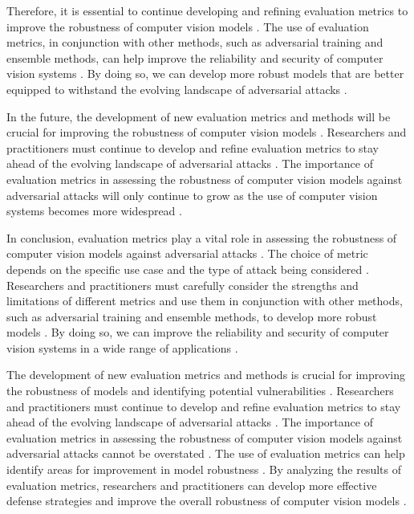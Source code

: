 \documentclass[11pt]{article}
\begin{document}
Therefore, it is essential to continue developing and refining evaluation metrics to improve the robustness of computer vision models \cite{ref165}. The use of evaluation metrics, in conjunction with other methods, such as adversarial training and ensemble methods, can help improve the reliability and security of computer vision systems \cite{ref21}. By doing so, we can develop more robust models that are better equipped to withstand the evolving landscape of adversarial attacks \cite{ref166}.

In the future, the development of new evaluation metrics and methods will be crucial for improving the robustness of computer vision models \cite{ref90}. Researchers and practitioners must continue to develop and refine evaluation metrics to stay ahead of the evolving landscape of adversarial attacks \cite{ref20}. The importance of evaluation metrics in assessing the robustness of computer vision models against adversarial attacks will only continue to grow as the use of computer vision systems becomes more widespread \cite{ref106}.

In conclusion, evaluation metrics play a vital role in assessing the robustness of computer vision models against adversarial attacks \cite{ref148}. The choice of metric depends on the specific use case and the type of attack being considered \cite{ref6}. Researchers and practitioners must carefully consider the strengths and limitations of different metrics and use them in conjunction with other methods, such as adversarial training and ensemble methods, to develop more robust models \cite{ref149}. By doing so, we can improve the reliability and security of computer vision systems in a wide range of applications \cite{ref150}.

The development of new evaluation metrics and methods is crucial for improving the robustness of models and identifying potential vulnerabilities \cite{ref167}. Researchers and practitioners must continue to develop and refine evaluation metrics to stay ahead of the evolving landscape of adversarial attacks \cite{ref168}. The importance of evaluation metrics in assessing the robustness of computer vision models against adversarial attacks cannot be overstated \cite{ref169}. The use of evaluation metrics can help identify areas for improvement in model robustness \cite{ref170}. By analyzing the results of evaluation metrics, researchers and practitioners can develop more effective defense strategies and improve the overall robustness of computer vision models \cite{ref171}.
\end{document}
